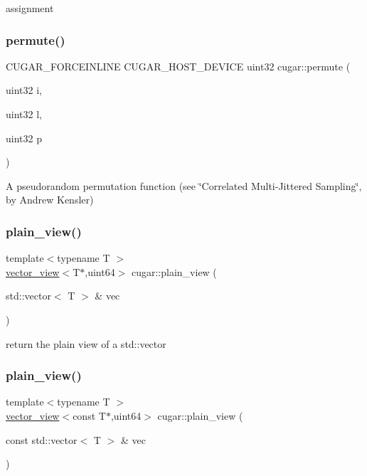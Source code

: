 assignment \mbox{\label{group___basic_gaa122cc1105ff380e14ba6a41f47dcc71}} 
\subsubsection{\texorpdfstring{permute()}{permute()}}
{\footnotesize\ttfamily C\+U\+G\+A\+R\+\_\+\+F\+O\+R\+C\+E\+I\+N\+L\+I\+NE C\+U\+G\+A\+R\+\_\+\+H\+O\+S\+T\+\_\+\+D\+E\+V\+I\+CE uint32 cugar\+::permute (\begin{DoxyParamCaption}\item[{uint32}]{i,  }\item[{uint32}]{l,  }\item[{uint32}]{p }\end{DoxyParamCaption})}

A pseudorandom permutation function (see \char`\"{}\+Correlated Multi-\/\+Jittered Sampling\char`\"{}, by Andrew Kensler) \mbox{\label{group___basic_ga6eb01f34e803fa6b384bf9930f6db426}} 
\subsubsection{\texorpdfstring{plain\+\_\+view()}{plain\_view()}\hspace{0.1cm}{\footnotesize\ttfamily [1/2]}}
{\footnotesize\ttfamily template$<$typename T $>$ \\
\hyperlink{structcugar_1_1vector__view}{vector\+\_\+view}$<$T$\ast$,uint64$>$ cugar\+::plain\+\_\+view (\begin{DoxyParamCaption}\item[{std\+::vector$<$ T $>$ \&}]{vec }\end{DoxyParamCaption})}

return the plain view of a std\+::vector \mbox{\label{group___basic_ga8e4563c0ae2373469c759169bd76d845}} 
\subsubsection{\texorpdfstring{plain\+\_\+view()}{plain\_view()}\hspace{0.1cm}{\footnotesize\ttfamily [2/2]}}
{\footnotesize\ttfamily template$<$typename T $>$ \\
\hyperlink{structcugar_1_1vector__view}{vector\+\_\+view}$<$const T$\ast$,uint64$>$ cugar\+::plain\+\_\+view (\begin{DoxyParamCaption}\item[{const std\+::vector$<$ T $>$ \&}]{vec }\end{DoxyParamCaption})}


